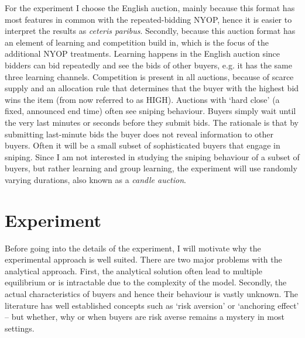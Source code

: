 \documentclass[a4paper,12pt]{article}
\begin{document}
	For the experiment I choose the English auction, mainly because this format has most features in common with the repeated-bidding NYOP, hence it is easier to interpret the results as {\it ceteris paribus}. Secondly, because this auction format has an element of learning and competition build in, which is the focus of the additional NYOP treatments. Learning happens in the English auction since bidders can bid repeatedly and see the bids of other buyers, e.g. it has the same three learning channels. Competition is present in all auctions, because of scarce supply and an allocation rule that determines that the buyer with the highest bid wins the item (from now referred to as HIGH). Auctions with `hard close' (a fixed, announced end time) often see sniping behaviour. Buyers simply wait until the very last minutes or seconds before they submit bids. The rationale is that by submitting last-minute bids the buyer does not reveal information to other buyers. Often it will be a small subset of sophisticated buyers that engage in sniping. Since I am not interested in studying the sniping behaviour of a subset of buyers, but rather learning and group learning, the experiment will use randomly varying durations, also known as a {\it candle auction}.

	\section{Experiment}

	Before going into the details of the experiment, I will motivate why the experimental approach is well suited. There are two major problems with the analytical approach. First, the analytical solution often lead to multiple equilibrium or is intractable due to the complexity of the model. Secondly, the actual characteristics of buyers and hence their behaviour is vastly unknown. The literature has well established concepts such as `risk aversion' or `anchoring effect' -- but whether, why or when buyers are risk averse remains a mystery in most settings. %
\end{document}
